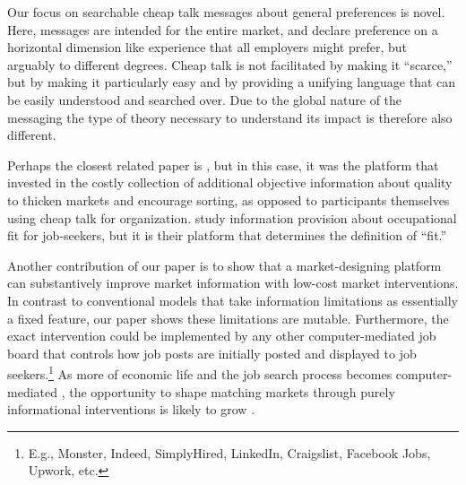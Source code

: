 \documentclass[12pt]{article}
\begin{document}
Our focus on searchable cheap talk messages about general preferences is novel. Here, messages are intended for the entire market, and declare preference on a horizontal dimension like experience that all employers might prefer, but arguably to different degrees. Cheap talk is not facilitated by making it ``scarce,'' but by making it particularly easy and by providing a unifying language that can be easily understood and searched over. Due to the global nature of the messaging the type of theory necessary to understand its impact is therefore also different. 

Perhaps the closest related paper is \cite{tadelis2011information}, but in this case, it was the platform that invested in the costly collection of additional objective information about quality to thicken markets and encourage sorting, as opposed to participants themselves using cheap talk for organization.
\cite{belot_etal2018} study information provision about occupational fit for job-seekers, but it is their platform that determines the definition of ``fit.'' 

Another contribution of our paper is to show that a market-designing platform can substantively improve market information with low-cost market interventions.
In contrast to conventional models that take information limitations as essentially a fixed feature, our paper shows these limitations are mutable.  
Furthermore, the exact intervention could be implemented by any other computer-mediated job board that controls how job posts are initially posted and displayed to job seekers.\footnote{
E.g., Monster, Indeed, SimplyHired, LinkedIn, Craigslist, Facebook Jobs, Upwork, etc. 
}
As more of economic life and the job search process becomes computer-mediated \citep{kuhn2004internet,kuhn2014internet,varian2010computer}, the opportunity to shape matching markets through purely informational interventions is likely to grow \citep{horton2017effects, belot_etal2018, gee2019more, bhole2021}.
\end{document}

